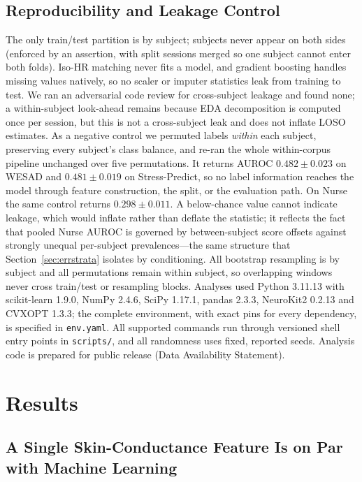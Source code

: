 \documentclass[healthcare,article,submit,moreauthors,pdftex]{Definitions/mdpi}
\begin{document}
\subsection{Reproducibility and Leakage Control}

The only train/test partition is by subject; subjects never appear on both sides
(enforced by an assertion, with split sessions merged so one subject cannot enter
both folds). Iso-HR matching never fits a model, and gradient boosting handles
missing values natively, so no scaler or imputer statistics leak from training to
test. We ran an adversarial code review for cross-subject leakage and found none;
a within-subject look-ahead remains because EDA decomposition is computed once per
session, but this is not a cross-subject leak and does not inflate LOSO estimates.
As a negative control we permuted labels \emph{within} each subject, preserving
every subject's class balance, and re-ran the whole within-corpus pipeline
unchanged over five permutations. It returns AUROC $0.482 \pm 0.023$ on WESAD and
$0.481 \pm 0.019$ on Stress-Predict, so no label information reaches the model
through feature construction, the split, or the evaluation path. On Nurse the
same control returns $0.298 \pm 0.011$. A below-chance value cannot indicate
leakage, which would inflate rather than deflate the statistic; it reflects the
fact that pooled Nurse AUROC is governed by between-subject score offsets against
strongly unequal per-subject prevalences---the same structure that
Section~\ref{sec:errstrata} isolates by conditioning. All bootstrap resampling
is by subject and all permutations remain within subject, so overlapping windows
never cross train/test or resampling blocks. Analyses used Python 3.11.13 with
scikit-learn 1.9.0, NumPy 2.4.6, SciPy 1.17.1, pandas 2.3.3, NeuroKit2 0.2.13 and
CVXOPT 1.3.3; the complete environment, with exact pins for every dependency, is
specified in \texttt{env.yaml}. All supported commands run through versioned
shell entry points in \texttt{scripts/}, and all randomness uses fixed, reported
seeds. Analysis code is prepared for public release (Data Availability
Statement).

\section{Results}

\subsection{A Single Skin-Conductance Feature Is on Par with Machine Learning}
\end{document}
